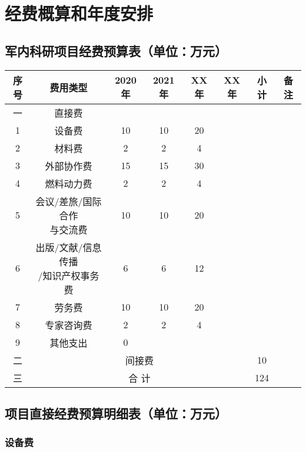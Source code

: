


\section{经费概算和年度安排}


\subsection{军内科研项目经费预算表（单位：万元）}


\begin{tabular}{cccccccc}
	\toprule
	序号&	费用类型&	2020年&	2021年&	XX年&	XX年&	小计&	备注
\\
	\midrule
	一&	直接费				 \\		
	1&	设备费&	10&	10&			20	
 \\
	2&	材料费&	2&	2&			4	
  \\
	3&	外部协作费&	15&	15&			30	
 \\
	4&	燃料动力费&	2&	2&			4	
 \\
	5&	\makecell[c]{会议/差旅/国际合作\\与交流费}&	10&	10&			20	
 \\
	6&	\makecell[c]{出版/文献/信息传播\\/知识产权事务费}&	6&	6&			12	
 \\
	7&	劳务费&	10&	10&			20	
 \\
	8&	专家咨询费&	2&	2&			4	
 \\
	9&	其他支出&					0	
 \\
	二 & \multicolumn{5}{c}{间接费} &	10	
 \\
	三 & \multicolumn{5}{c}{合 计}	& 124
 \\
	\bottomrule
\end{tabular}



\subsection{项目直接经费预算明细表（单位：万元）}

\subsubsection{设备费}

